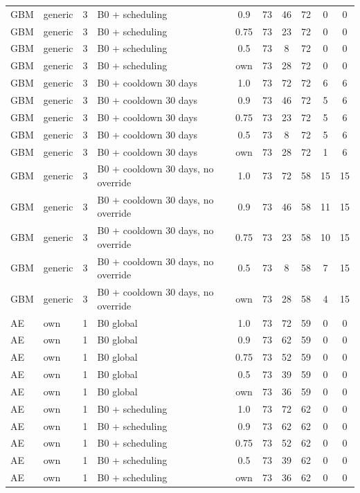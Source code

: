 \begin{longtable}{lllp{4.4cm}cccccc}
GBM & generic & 3 & B0 + scheduling & 0.9 & 73 & 46 & 72 & 0 & 0 \\
GBM & generic & 3 & B0 + scheduling & 0.75 & 73 & 23 & 72 & 0 & 0 \\
GBM & generic & 3 & B0 + scheduling & 0.5 & 73 & 8 & 72 & 0 & 0 \\
GBM & generic & 3 & B0 + scheduling & own & 73 & 28 & 72 & 0 & 0 \\
GBM & generic & 3 & B0 + cooldown 30 days & 1.0 & 73 & 72 & 72 & 6 & 6 \\
GBM & generic & 3 & B0 + cooldown 30 days & 0.9 & 73 & 46 & 72 & 5 & 6 \\
GBM & generic & 3 & B0 + cooldown 30 days & 0.75 & 73 & 23 & 72 & 5 & 6 \\
GBM & generic & 3 & B0 + cooldown 30 days & 0.5 & 73 & 8 & 72 & 5 & 6 \\
GBM & generic & 3 & B0 + cooldown 30 days & own & 73 & 28 & 72 & 1 & 6 \\
GBM & generic & 3 & B0 + cooldown 30 days, no override & 1.0 & 73 & 72 & 58 & 15 & 15 \\
GBM & generic & 3 & B0 + cooldown 30 days, no override & 0.9 & 73 & 46 & 58 & 11 & 15 \\
GBM & generic & 3 & B0 + cooldown 30 days, no override & 0.75 & 73 & 23 & 58 & 10 & 15 \\
GBM & generic & 3 & B0 + cooldown 30 days, no override & 0.5 & 73 & 8 & 58 & 7 & 15 \\
GBM & generic & 3 & B0 + cooldown 30 days, no override & own & 73 & 28 & 58 & 4 & 15 \\
AE & own & 1 & B0 global & 1.0 & 73 & 72 & 59 & 0 & 0 \\
AE & own & 1 & B0 global & 0.9 & 73 & 62 & 59 & 0 & 0 \\
AE & own & 1 & B0 global & 0.75 & 73 & 52 & 59 & 0 & 0 \\
AE & own & 1 & B0 global & 0.5 & 73 & 39 & 59 & 0 & 0 \\
AE & own & 1 & B0 global & own & 73 & 36 & 59 & 0 & 0 \\
AE & own & 1 & B0 + scheduling & 1.0 & 73 & 72 & 62 & 0 & 0 \\
AE & own & 1 & B0 + scheduling & 0.9 & 73 & 62 & 62 & 0 & 0 \\
AE & own & 1 & B0 + scheduling & 0.75 & 73 & 52 & 62 & 0 & 0 \\
AE & own & 1 & B0 + scheduling & 0.5 & 73 & 39 & 62 & 0 & 0 \\
AE & own & 1 & B0 + scheduling & own & 73 & 36 & 62 & 0 & 0 \\

\end{longtable}
